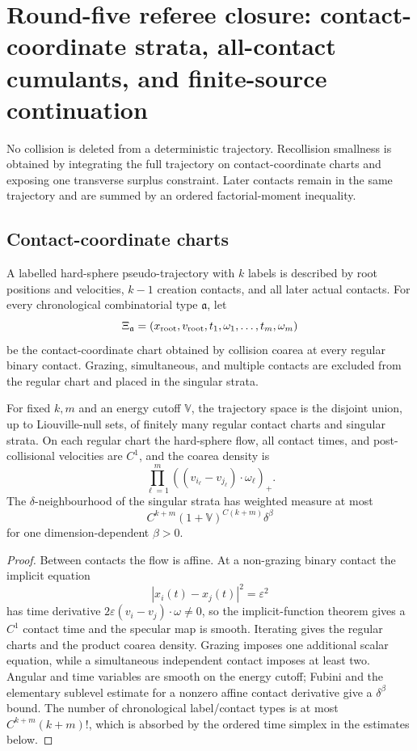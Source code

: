 \section{Round-five referee closure: contact-coordinate strata, all-contact cumulants, and finite-source continuation}
\label{sec:r5-b2}

No collision is deleted from a deterministic trajectory.  Recollision
smallness is obtained by integrating the full trajectory on contact-coordinate
charts and exposing one transverse surplus constraint.  Later contacts remain
in the same trajectory and are summed by an ordered factorial-moment
inequality.

\subsection{Contact-coordinate charts}

A labelled hard-sphere pseudo-trajectory with \(k\) labels is described by
root positions and velocities, \(k-1\) creation contacts, and all later actual
contacts.  For every chronological combinatorial type \({\mathfrak a}\), let
\[
 \Xi_{\mathfrak a}
 =(x_{\rm root},v_{\rm root},t_1,\omega_1,\ldots,t_m,\omega_m)
\]
be the contact-coordinate chart obtained by collision coarea at every regular
binary contact.  Grazing, simultaneous, and multiple contacts are excluded
from the regular chart and placed in the singular strata.

\begin{lemma}
\label{lem:r5-b2-atlas}
For fixed \(k,m\) and an energy cutoff \({\mathbb V}\), the trajectory space
is the disjoint union, up to Liouville-null sets, of finitely many regular
contact charts and singular strata.  On each regular chart the hard-sphere
flow, all contact times, and post-collisional velocities are \(C^1\), and the
coarea density is
\[
 \prod_{\ell=1}^m
 ((v_{i_\ell}-v_{j_\ell})\cdot\omega_\ell)_+.
\]
The \(\delta\)-neighbourhood of the singular strata has weighted measure at
most
\[
 C^{k+m}(1+{\mathbb V})^{C(k+m)}\delta^\beta
\]
for one dimension-dependent \(\beta>0\).
\end{lemma}

\begin{proof}
Between contacts the flow is affine.  At a non-grazing binary contact the
implicit equation
\[
 |x_i(t)-x_j(t)|^2=\varepsilon^2
\]
has time derivative
\(2\varepsilon(v_i-v_j)\cdot\omega\ne0\), so the implicit-function theorem
gives a \(C^1\) contact time and the specular map is smooth.  Iterating gives
the regular charts and the product coarea density.  Grazing imposes one
additional scalar equation, while a simultaneous independent contact imposes
at least two.  Angular and time variables are smooth on the energy cutoff;
Fubini and the elementary sublevel estimate for a nonzero affine contact
derivative give a \(\delta^\beta\) bound.  The number of chronological
label/contact types is at most \(C^{k+m}(k+m)!\), which is absorbed by the
ordered time simplex in the estimates below.
\end{proof}

